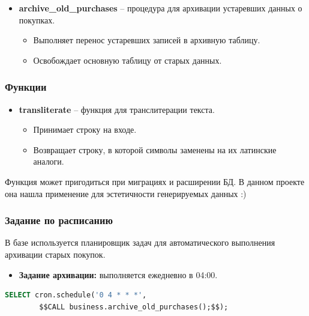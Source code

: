 \documentclass[a4paper,12pt]{article}
\begin{document}
    \begin{itemize}
        \item \textbf{archive\_old\_purchases} – процедура для архивации устаревших данных о покупках.
        \begin{itemize}
            \item Выполняет перенос устаревших записей в архивную таблицу.
            \item Освобождает основную таблицу от старых данных.
        \end{itemize}
    \end{itemize}

    \subsubsection{Функции}

    \begin{itemize}
        \item \textbf{transliterate} – функция для транслитерации текста.
        \begin{itemize}
            \item Принимает строку на входе.
            \item Возвращает строку, в которой символы заменены на их латинские аналоги.
        \end{itemize}
    \end{itemize}
    Функция может пригодиться при миграциях и расширении БД.
    В данном проекте она нашла применение для эстетичности генерируемых данных :)

    \subsubsection{Задание по расписанию}

    В базе используется планировщик задач для автоматического выполнения архивации старых покупок.

    \begin{itemize}
        \item \textbf{Задание архивации:} выполняется ежедневно в 04:00.
    \end{itemize}

    \begin{lstlisting}[language=SQL, frame=single, basicstyle=\normalsize\ttfamily, breaklines=true]
    SELECT cron.schedule('0 4 * * *',
        $$CALL business.archive_old_purchases();$$);
    \end{lstlisting}
\end{document}
